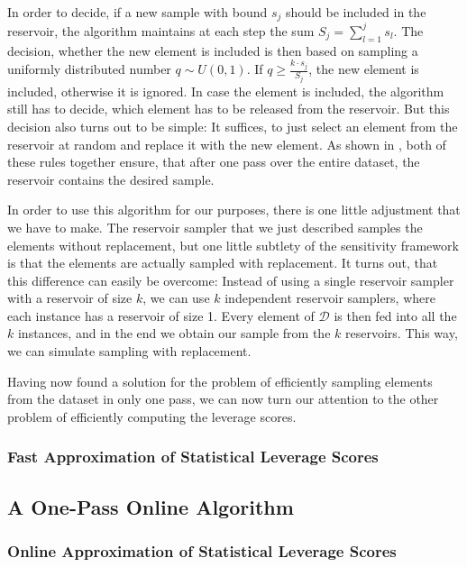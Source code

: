 In order to decide, if a new sample with bound $s_j$ should be
included in the reservoir, the algorithm maintains at each step
the sum $S_j = \sum_{l=1}^j s_l$. The decision, whether
the new element is included is then based on sampling
a uniformly distributed number $q \sim U(0, 1)$.
If $q \geq \frac{k \cdot s_j}{S_j}$, the new element is included,
otherwise it is ignored. In case the element is included, the
algorithm still has to decide, which element has to be released
from the reservoir. But this decision also turns out to be simple:
It suffices, to just select an element from the reservoir at
random and replace it with the new element.
As shown in \cite{reservoir-sampler}, both of these rules together
ensure, that after one pass over the entire dataset, the
reservoir contains the desired sample.

In order to use this algorithm for our purposes, there is one
little adjustment that we have to make. The reservoir sampler
that we just described samples the elements without replacement,
but one little subtlety of the sensitivity framework is that the
elements are actually sampled with replacement.
It turns out, that this difference can easily be overcome:
Instead of using a single reservoir sampler with a reservoir of
size $k$, we can use $k$ independent reservoir samplers, where
each instance has a reservoir of size 1. Every element of
$\mathcal{D}$ is then fed into all the $k$ instances, and in the
end we obtain our sample from the $k$ reservoirs. This way,
we can simulate sampling with replacement.

Having now found a solution for the problem of efficiently sampling
elements from the dataset in only one pass, we can now turn
our attention to the other problem of efficiently computing
the leverage scores.

\subsubsection{Fast Approximation of Statistical Leverage Scores}

\subsection{A One-Pass Online Algorithm}

\subsubsection{Online Approximation of Statistical Leverage Scores}
